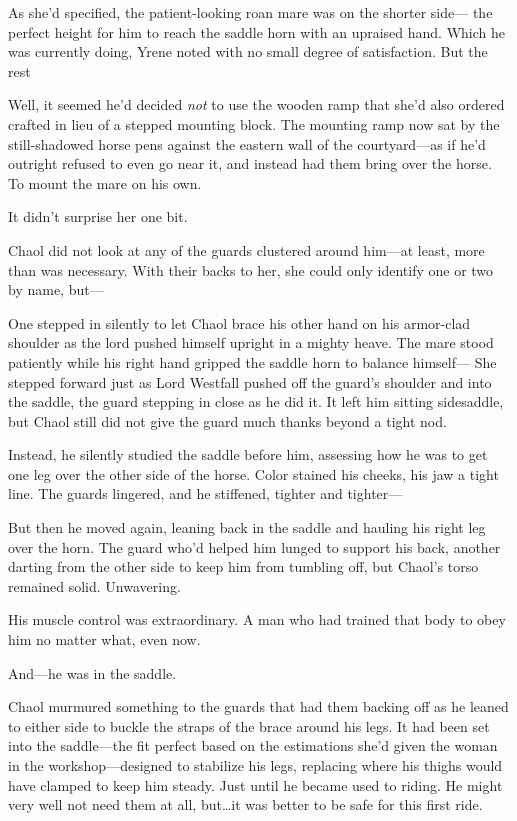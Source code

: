 As she'd specified, the patient-looking roan mare was on the shorter side--- the perfect height for him to reach the saddle horn with an upraised hand.
Which he was currently doing, Yrene noted with no small degree of satisfaction.
But the rest 

Well, it seemed he'd decided \emph{not} to use the wooden ramp that she'd also ordered crafted in lieu of a stepped mounting block.
The mounting ramp now sat by the still-shadowed horse pens against the eastern wall of the courtyard---as if he'd outright refused to even go near it, and instead had them bring over the horse.
To mount the mare on his own.

It didn't surprise her one bit.

Chaol did not look at any of the guards clustered around him---at least, more than was necessary.
With their backs to her, she could only identify one or two by name, but---

One stepped in silently to let Chaol brace his other hand on his armor-clad shoulder as the lord pushed himself upright in a mighty heave.
The mare stood patiently while his right hand gripped the saddle horn to balance himself--- She stepped forward just as Lord Westfall pushed off the guard's shoulder and into the saddle, the guard stepping in close as he did it.
It left him sitting sidesaddle, but Chaol still did not give the guard much thanks beyond a tight nod.

Instead, he silently studied the saddle before him, assessing how he was to get one leg over the other side of the horse.
Color stained his cheeks, his jaw a tight line.
The guards lingered, and he stiffened, tighter and tighter---

But then he moved again, leaning back in the saddle and hauling his right leg over the horn.
The guard who'd helped him lunged to support his back, another darting from the other side to keep him from tumbling off, but Chaol's torso remained solid.
Unwavering.

His muscle control was extraordinary.
A man who had trained that body to obey him no matter what, even now.

And---he was in the saddle.

Chaol murmured something to the guards that had them backing off as he leaned to either side to buckle the straps of the brace around his legs.
It had been set into the saddle---the fit perfect based on the estimations she'd given the woman in the workshop---designed to stabilize his legs, replacing where his thighs would have clamped to keep him steady.
Just until he became used to riding.
He might very well not need them at all, but\ldots it was better to be safe for this first ride.

